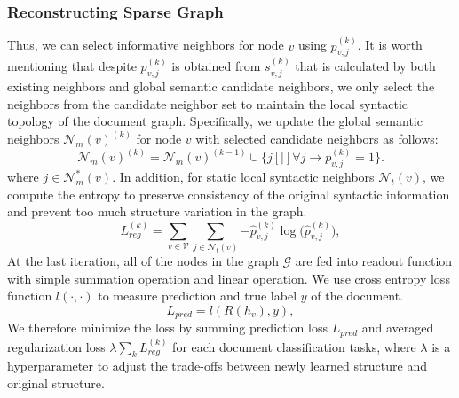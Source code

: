 \documentclass[letterpaper]{article} %
\begin{document}
\subsubsection{Reconstructing Sparse Graph} 
Thus, we can select informative neighbors for node $v$ using $p_{v,j}^{(k)}$. It is worth mentioning that despite $p_{v,j}^{(k)}$ is obtained from $s_{v,j}^{(k)}$ that is calculated by both existing 
neighbors and global semantic candidate neighbors, we only select the neighbors from the candidate neighbor set to maintain the local syntactic topology of the document graph. Specifically, we update the global semantic neighbors $\mathcal{N}_m(v)^{(k)}$ for node $v$ with selected candidate neighbors as follows:
\begin{equation}
\mathcal{N}_{m}(v)^{(k)}=\mathcal{N}_{m}(v)^{(k-1)}\cup{\{j\left[|\right]\forall{j\to{p}_{v,j}^{(k)}=1\}}}.
\end{equation}
where $j\in\mathcal{N}^*_m(v)$. In addition, for static local syntactic neighbors $\mathcal{N}_t(v)$, we compute the entropy to preserve consistency of the original syntactic information and prevent too much structure variation in the graph.
\begin{equation}
L_{reg}^{(k)} = \sum_{v\in\mathcal{V}}{\sum_{j\in\mathcal{N}_t(v)}{- \hat{p}_{v,j}^{(k)}\log{(\hat{p}_{v,j}^{(k)}}})},
\end{equation}
At the last iteration, all of the nodes in the graph $\mathcal{G}$ are fed into readout function with simple summation operation and linear operation. We use cross entropy loss function $l(\cdot,\cdot)$ to measure prediction and true label $y$ of the document.
\begin{equation}
L_{pred} = l(R(h_{v}), y),
\end{equation}
We therefore minimize the loss by summing prediction loss $L_{pred}$ and averaged regularization loss $\lambda\sum_{k}{L_{reg}^{(k)}}$ for each document classification tasks, where $\lambda$ is a hyperparameter to adjust the trade-offs between newly learned structure and original structure. 
\end{document}
